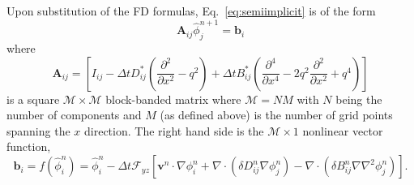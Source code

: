 \documentclass[journal=mamobx,manuscript=suppinfo]{achemso}
\begin{document}
Upon substitution of the FD formulas, Eq.~\ref{eq:semiimplicit} is of the form
\begin{equation} \label{eq:big_linear}
\bm{A}_{ij} \hat{\phi}_{j}^{n+1} = \bm{b}_{i}
\end{equation}
where
\begin{equation}
\bm{A}_{ij} = \left [ I_{ij} 
    - \Delta t D^{*}_{ij} \left ( \frac{\partial^2 }{\partial x^2} - q^{2} \right )
    + \Delta t B^{*}_{ij} \left ( \frac{ \partial^{4} }{\partial x^{4}} 
                                  - 2 q^{2} \frac{\partial^{2}}{\partial x^{2}} 
                                  + q^{4} \right ) \right ] 
\end{equation}
is a square $\mathcal{M}\times\mathcal{M}$ block-banded matrix where $\mathcal{M} = N M$ with $N$ being the number of components and $M$ (as defined above) is the number of grid points spanning the $x$ direction.
The right hand side is the $\mathcal{M} \times 1$ nonlinear vector function,
\begin{equation} \label{eq:rhs}
\bm{b}_{i} = f(\hat{\phi}_{i}^{n}) = 
      \hat{\phi}_{i}^{n}
    - \Delta t \mathcal{F}_{yz}\left [ \bm{v}^{n} \cdot \nabla \phi_{i}^{n} 
    + \nabla \cdot \left ( \delta D_{ij}^{n} \nabla \phi_{j}^{n} \right )
    - \nabla \cdot \left ( \delta B_{ij}^{n} \nabla \nabla^{2} \phi_{j}^{n} \right ) \right ] \mathrm{.}
\end{equation}
\end{document}
